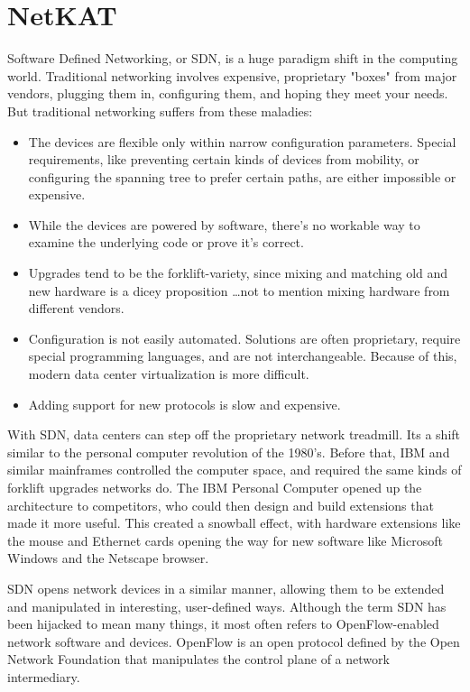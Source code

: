 
\chapter{NetKAT}

Software Defined Networking, or SDN, is a huge paradigm shift in the computing world.  
Traditional networking involves 
expensive, proprietary "boxes" from major vendors, plugging them in, configuring them, and hoping they 
meet your needs.  
But traditional networking suffers from these maladies:

\begin{itemize}
\item The devices are flexible only within narrow configuration parameters. 
Special requirements, like preventing certain kinds of devices from mobility, or configuring 
the spanning tree to prefer certain paths, are either impossible or expensive.
\item While the devices are powered by software, there's no workable way to examine the underlying code or prove it's correct.  
\item Upgrades tend to be the forklift-variety, since mixing and matching old and new hardware is a dicey proposition
\ldots not to mention mixing hardware from different vendors.
\item Configuration is not easily automated. 
Solutions are often proprietary, require special programming languages, and are not interchangeable.
Because of this, modern data center virtualization is more difficult.
\item Adding support for new protocols is slow and expensive.
\end{itemize}

With SDN, data centers can step off the proprietary network treadmill.  
Its a shift similar to the personal computer revolution of the 1980's.
Before that, IBM and similar mainframes controlled the computer space, and required the same kinds of 
forklift upgrades networks do.
The IBM Personal Computer opened up the architecture to competitors, who could then design and 
build extensions
that made it more useful.
This created a snowball effect, with hardware extensions like the mouse and Ethernet cards opening the way 
for new software like Microsoft Windows and the Netscape browser.

SDN opens network devices in a similar manner, allowing them to be extended and manipulated in interesting,
user-defined ways.
Although the term SDN has been hijacked to mean many things, it most often refers to OpenFlow-enabled 
network software and devices.
OpenFlow is an open protocol defined by the Open Network Foundation that manipulates the control 
plane of a network intermediary.  

